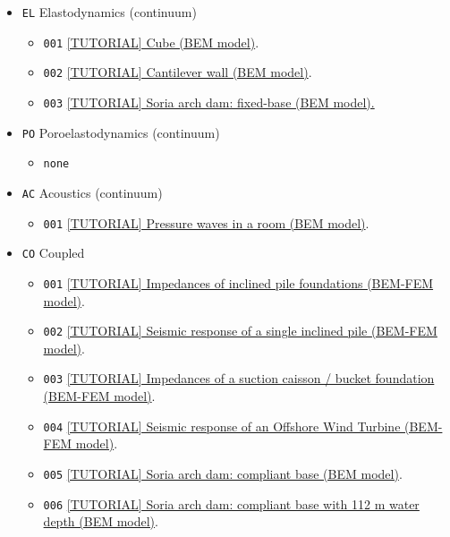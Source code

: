 \documentclass{article}
\begin{document}
\begin{itemize}
\begin{itemize}
\begin{itemize}
\begin{itemize}
            \end{itemize}             
            \item \texttt{EL} Elastodynamics (continuum)
            \begin{itemize}
                \item \texttt{001} \href{ME-TH-EL-001/ME-TH-EL-001.pdf}{[TUTORIAL] Cube (BEM model)}.
                \item \texttt{002} \href{ME-TH-EL-002/ME-TH-EL-002.pdf}{[TUTORIAL] Cantilever wall (BEM model)}.
                \item \texttt{003} \href{ME-TH-EL-003/ME-TH-EL-003.pdf}{[TUTORIAL] Soria arch dam: fixed-base (BEM model).}
            \end{itemize}            
            \item \texttt{PO} Poroelastodynamics (continuum)
            \begin{itemize}
                \item \texttt{none}
            \end{itemize}                 
            \item \texttt{AC} Acoustics (continuum)
            \begin{itemize}
                \item \texttt{001} \href{ME-TH-AC-001/ME-TH-AC-001.pdf}{[TUTORIAL] Pressure waves in a room (BEM model)}.
            \end{itemize}             
            \item \texttt{CO} Coupled 
            \begin{itemize}
                \item \texttt{001} \href{ME-TH-CO-001/ME-TH-CO-001.pdf}{[TUTORIAL] Impedances of inclined pile foundations (BEM-FEM model)}.
                \item \texttt{002} \href{ME-TH-CO-002/ME-TH-CO-002.pdf}{[TUTORIAL] Seismic response of a single inclined pile (BEM-FEM model)}.
                \item \texttt{003} \href{ME-TH-CO-003/ME-TH-CO-003.pdf}{[TUTORIAL] Impedances of a suction caisson / bucket foundation (BEM-FEM model)}.
                \item \texttt{004} \href{ME-TH-CO-004/ME-TH-CO-004.pdf}{[TUTORIAL] Seismic response of an Offshore Wind Turbine (BEM-FEM model)}.
                \item \texttt{005} \href{ME-TH-CO-005/ME-TH-CO-005.pdf}{[TUTORIAL] Soria arch dam: compliant base (BEM model)}.
                \item \texttt{006} \href{ME-TH-CO-006/ME-TH-CO-006.pdf}{[TUTORIAL] Soria arch dam: compliant base with 112 m water depth (BEM model)}.
            \end{itemize}                  
        \end{itemize}        
    \end{itemize}    
\end{itemize}
\end{document}
